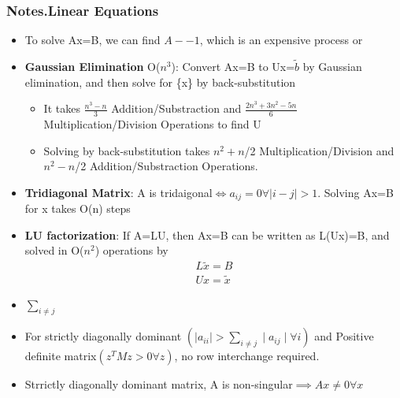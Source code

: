 \documentclass[12pt,letterpaper]{article}
\newcommand\asgnname{Notes}         %
\newenvironment{answer}[1]{
  \subsubsection*{%
  \asgnname.#1}
}{\newpage}
\begin{document}
\begin{answer}{Linear Equations}
\begin{itemize}
    \item To solve Ax=B, we can find $A-{-1}$, which is an expensive process or
    \item \textbf{Gaussian Elimination} O($n^3$): Convert Ax=B to Ux=$\tilde{b}$ by Gaussian elimination, and then solve for \{x\} by back-substitution
    \begin{itemize}
        \item It takes $\frac{n^3-n}{3}$ Addition/Substraction and $\frac{2n^3+3n^2-5n}{6}$ Multiplication/Division Operations to find U
        \item Solving by back-substitution takes $n^2+n$/2 Multiplication/Division and $n^2-n$/2 Addition/Substraction Operations.
    \end{itemize}
    \item \textbf{Tridiagonal Matrix}: A is tridaigonal$\iff a_{ij}=0 \forall \mid i-j \mid>1$. Solving Ax=B for x takes O(n) steps
    \item \textbf{LU factorization}: If A=LU, then Ax=B can be written as L(Ux)=B, and solved in O($n^2$) operations by
    \begin{align}
        L\tilde{x} = B\\
        Ux = \tilde{x}
    \end{align}
    \item $\sum _{i \not= j}$
    \item For strictly diagonally dominant $\left( \mid a_{ii} \mid > \sum _{i \not= j} \mid a_{ij} \mid \forall i\right)$ and Positive definite matrix$( z^TMz > 0 \forall z)$, no row interchange required.
    \item Strrictly diagonally dominant matrix, A is non-singular$\implies Ax \not= 0 \forall x$
\end{itemize}
\end{answer}
\end{document}
